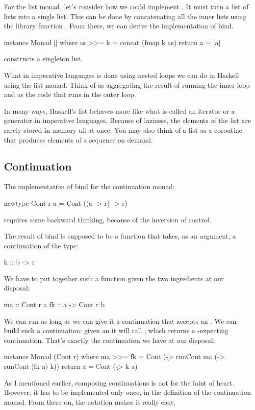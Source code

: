 \documentclass[DaoFP]{subfiles}
\begin{document}
For the list monad, let's consider how we could implement . It must turn a list of lists into a single list. This can be done by concatenating all the inner lists using the library function . From there, we can derive the implementation of bind.
\begin{haskell}
instance Monad [] where
  as >>= k = concat (fmap k as)
  return a = [a]
\end{haskell}
 constructs a singleton list.

What in imperative languages is done using nested loops we can do in Haskell using the list monad. Think of  as aggregating the result of running the inner loop and  as the code that runs in the outer loop. 

In many ways, Haskell's list behaves more like what is called an iterator or a generator in imperative languages. Because of laziness, the elements of the list are rarely stored in memory all at once. You may also think of a list as a coroutine that produces elements of a sequence on demand.

\subsection{Continuation}

The implementation of bind for the continuation monad:

\begin{haskell}
newtype Cont r a = Cont ((a -> r) -> r)
\end{haskell}
requires some backward thinking, because of the inversion of control. 

The result of bind is supposed to be a function that takes, as an argument, a continuation  of the type:
\begin{haskell}
k :: b -> r
\end{haskell}
We have to put together such a function given the two ingredients at our disposal: 
\begin{haskell}
ma :: Cont r a
fk :: a -> Cont r b
\end{haskell}
We can run  as long as we can give it a continuation that accepts an . We can build such a continuation: given an  it will call , which returns a -expecting continuation. That's exactly the continuation  we have at our disposal:
\begin{haskell}
instance Monad (Cont r) where
  ma >>= fk = Cont (\k -> runCont ma (\a -> runCont (fk a) k))
  return a = Cont (\k -> k a)
\end{haskell}
As I mentioned earlier, composing continuations is not for the faint of heart. However, it has to be implemented only once, in the definition of the continuation monad. From there on, the  notation makes it really easy.
\end{document}
